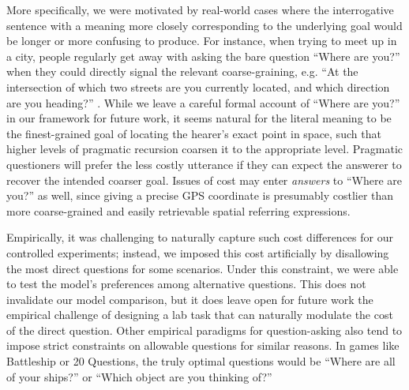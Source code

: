 \documentclass[11pt, floatsintext]{apa6}
\begin{document}
More specifically, we were motivated by real-world cases where the interrogative sentence with a meaning more closely corresponding to the underlying goal would be longer or more confusing to produce. 
For instance, when trying to meet up in a city, people regularly get away with asking the bare question ``Where are you?'' when they could directly signal the relevant coarse-graining, e.g. ``At the intersection of which two streets are you currently located, and which direction are you heading?'' \cite{Potts12_CardsDialogueCorpus}.
While we leave a careful formal account of ``Where are you?'' in our framework for future work, it seems natural for the literal meaning to be the finest-grained goal of locating the hearer's exact point in space, such that higher levels of pragmatic recursion coarsen it to the appropriate level.
Pragmatic questioners will prefer the less costly utterance if they can expect the answerer to recover the intended coarser goal.
Issues of cost may enter \emph{answers} to ``Where are you?'' as well, since giving a precise GPS coordinate is presumably costlier than more coarse-grained and easily retrievable spatial referring expressions.

Empirically, it was challenging to naturally capture such cost differences for our controlled experiments; instead, we imposed this cost artificially by disallowing the most direct questions for some scenarios. 
Under this constraint, we were able to test the model's preferences among alternative questions.
This does not invalidate our model comparison, but it does leave open for future work the empirical challenge of designing a lab task that can naturally modulate the cost of the direct question. 
Other empirical paradigms for question-asking also tend to impose strict constraints on allowable questions for similar reasons. 
In games like Battleship or 20 Questions, the truly optimal questions would be ``Where are all of your ships?'' or ``Which object are you thinking of?''
\end{document}
